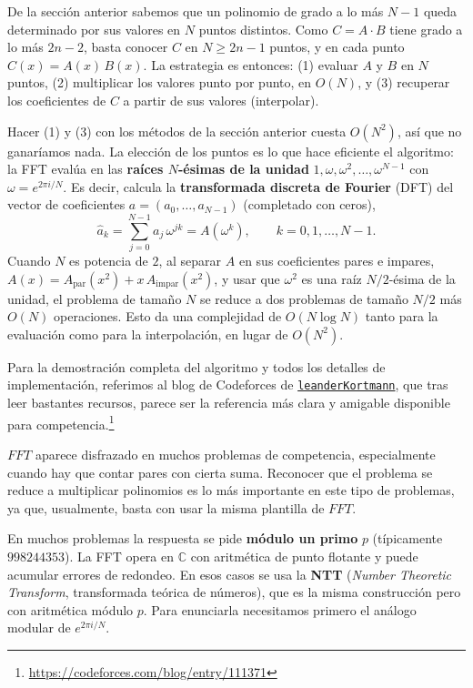 De la sección anterior sabemos que un polinomio de grado a lo más $N-1$ queda determinado por sus valores en $N$ puntos distintos. Como $C=A\cdot B$ tiene grado a lo más $2n-2$, basta conocer $C$ en $N \ge 2n-1$ puntos, y en cada punto $C(x)=A(x)\,B(x)$. La estrategia es entonces: (1) evaluar $A$ y $B$ en $N$ puntos, (2) multiplicar los valores punto por punto, en $O(N)$, y (3) recuperar los coeficientes de $C$ a partir de sus valores (interpolar).

Hacer (1) y (3) con los métodos de la sección anterior cuesta $O(N^2)$, así que no ganaríamos nada. La elección de los puntos es lo que hace eficiente el algoritmo: la FFT evalúa en las \textbf{raíces $N$-ésimas de la unidad} $1, \omega, \omega^2, \dots, \omega^{N-1}$ con $\omega = e^{2\pi i/N}$. Es decir, calcula la \textbf{transformada discreta de Fourier} (DFT) del vector de coeficientes $a=(a_0,\dots,a_{N-1})$ (completado con ceros),
\[
\hat a_k = \sum_{j=0}^{N-1} a_j\,\omega^{jk} = A(\omega^k), \qquad k = 0, 1, \dots, N-1.
\]
Cuando $N$ es potencia de $2$, al separar $A$ en sus coeficientes pares e impares, $A(x)=A_{\mathrm{par}}(x^2)+x\,A_{\mathrm{impar}}(x^2)$, y usar que $\omega^2$ es una raíz $N/2$-ésima de la unidad, el problema de tamaño $N$ se reduce a dos problemas de tamaño $N/2$ más $O(N)$ operaciones. Esto da una complejidad de $O(N\log N)$ tanto para la evaluación como para la interpolación, en lugar de $O(N^2)$.

Para la demostración completa del algoritmo y todos los detalles de implementación, referimos al blog de Codeforces de \href{https://codeforces.com/blog/entry/111371}{\texttt{leanderKortmann}}, que tras leer bastantes recursos, parece ser la referencia más clara y amigable disponible para competencia.\footnote{\url{https://codeforces.com/blog/entry/111371}}

$FFT$ aparece disfrazado en muchos problemas de competencia, especialmente cuando hay que contar pares con cierta suma. Reconocer que el problema se reduce a multiplicar polinomios es lo más importante en este tipo de problemas, ya que, usualmente, basta con usar la misma plantilla de $FFT$.

En muchos problemas la respuesta se pide \textbf{módulo un primo} $p$ (típicamente $998244353$). La FFT opera en $\mathbb{C}$ con aritmética de punto flotante y puede acumular errores de redondeo. En esos casos se usa la \textbf{NTT} (\emph{Number Theoretic Transform}, transformada teórica de números), que es la misma construcción pero con aritmética módulo $p$. Para enunciarla necesitamos primero el análogo modular de $e^{2\pi i/N}$.

